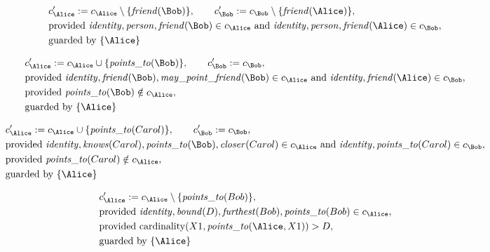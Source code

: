 \begin{align*}
&
c'_
{
\Alice
}
 := 
c_
{
\Alice
}
 \setminus 
\{
\mathit{\detokenize{
friend
}}
(
\Bob
)
\}
, \qquad 
c'_
{
\Bob
}
 := 
c_
{
\Bob
}
 \setminus 
\{
\mathit{\detokenize{
friend
}}
(
\Alice
)
\}
,\\
&
\text{provided } 
\mathit{\detokenize{
identity
}}
,
\mathit{\detokenize{
person
}}
,
\mathit{\detokenize{
friend
}}
(
\Bob
)
 \in c_
{
\Alice
}
 \text{ and } 
\mathit{\detokenize{
identity
}}
,
\mathit{\detokenize{
person
}}
,
\mathit{\detokenize{
friend
}}
(
\Alice
)
 \in c_
{
\Bob
}
,\\
&
\text{guarded by } \{
\Alice
\}
\end{align*}

\begin{align*}
&
c'_
{
\Alice
}
 := 
c_
{
\Alice
}
 \cup 
\{
\mathit{\detokenize{
points_to
}}
(
\Bob
)
\}
, \qquad 
c'_
{
\Bob
}
 := 
c_
{
\Bob
}
,\\
&
\text{provided } 
\mathit{\detokenize{
identity
}}
,
\mathit{\detokenize{
friend
}}
(
\Bob
)
,
\mathit{\detokenize{
may_point_friend
}}
(
\Bob
)
 \in c_
{
\Alice
}
 \text{ and } 
\mathit{\detokenize{
identity
}}
,
\mathit{\detokenize{
friend
}}
(
\Alice
)
 \in c_
{
\Bob
}
,\\
&
\text{provided } 
\mathit{\detokenize{
points_to
}}
(
\Bob
)
 \notin c_
{
\Alice
}
,\\
&
\text{guarded by } \{
\Alice
\}
\end{align*}

\begin{align*}
&
c'_
{
\Alice
}
 := 
c_
{
\Alice
}
 \cup 
\{
\mathit{\detokenize{
points_to
}}
(
Carol
)
\}
, \qquad 
c'_
{
\Bob
}
 := 
c_
{
\Bob
}
,\\
&
\text{provided } 
\mathit{\detokenize{
identity
}}
,
\mathit{\detokenize{
knows
}}
(
Carol
)
,
\mathit{\detokenize{
points_to
}}
(
\Bob
)
,
\mathit{\detokenize{
closer
}}
(
Carol
)
 \in c_
{
\Alice
}
 \text{ and } 
\mathit{\detokenize{
identity
}}
,
\mathit{\detokenize{
points_to
}}
(
Carol
)
 \in c_
{
\Bob
}
,\\
&
\text{provided } 
\mathit{\detokenize{
points_to
}}
(
Carol
)
 \notin c_
{
\Alice
}
,\\
&
\text{guarded by } \{
\Alice
\}
\end{align*}

\begin{align*}
&
c'_
{
\Alice
}
 := 
c_
{
\Alice
}
 \setminus 
\{
\mathit{\detokenize{
points_to
}}
(
Bob
)
\}
,\\
&
\text{provided } 
\mathit{\detokenize{
identity
}}
,
\mathit{\detokenize{
bound
}}
(
D
)
,
\mathit{\detokenize{
furthest
}}
(
Bob
)
,
\mathit{\detokenize{
points_to
}}
(
Bob
)
 \in c_
{
\Alice
}
,\\
&
\text{provided } 
\mathrm{cardinality}(
X1
,
\mathit{\detokenize{
points_to
}}
(
\Alice
,
X1
)
)
>
D
,\\
&
\text{guarded by } \{
\Alice
\}
\end{align*}
